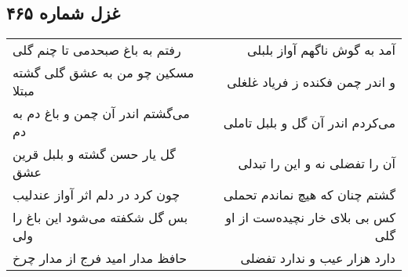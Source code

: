 \begin{center}
\section*{غزل شماره ۴۶۵}
\label{sec:sh465}
\begin{longtable}{l p{0.5cm} r}
رفتم به باغ صبحدمی تا چنم گلی
&&
آمد به گوش ناگهم آواز بلبلی
\\
مسکین چو من به عشق گلی گشته مبتلا
&&
و اندر چمن فکنده ز فریاد غلغلی
\\
می‌گشتم اندر آن چمن و باغ دم به دم
&&
می‌کردم اندر آن گل و بلبل تاملی
\\
گل یار حسن گشته و بلبل قرین عشق
&&
آن را تفضلی نه و این را تبدلی
\\
چون کرد در دلم اثر آواز عندلیب
&&
گشتم چنان که هیچ نماندم تحملی
\\
بس گل شکفته می‌شود این باغ را ولی
&&
کس بی بلای خار نچیده‌ست از او گلی
\\
حافظ مدار امید فرج از مدار چرخ
&&
دارد هزار عیب و ندارد تفضلی
\\
\end{longtable}
\end{center}
